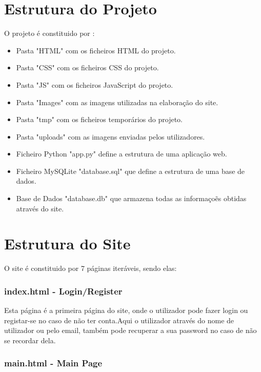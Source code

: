 \documentclass{report}
\begin{document}
\section {Estrutura do Projeto}\label{sec:estrutura-do-projeto}

O projeto é constituido por :

\begin{itemize}
    \item Pasta "HTML" com os ficheiros HTML do projeto.
    \item Pasta "CSS" com os ficheiros CSS do projeto.
    \item Pasta "JS" com os ficheiros JavaScript do projeto.
    \item Pasta "Images" com as imagens utilizadas na elaboração do site.
    \item Pasta "tmp" com os ficheiros temporários do projeto.
    \item Pasta "uploads" com as imagens enviadas pelos utilizadores.
    \item Ficheiro Python "app.py" define a estrutura de uma aplicação web.
    \item Ficheiro MySQLite "database.sql" que define a estrutura de uma base de dados.
    \item Base de Dados "database.db" que armazena todas as informaçoẽs obtidas através do site.
\end{itemize}

\section {Estrutura do Site}\label{sec:estrutura-do-site}

\indent O site é constituido por 7 páginas iteráveis, sendo elas:

\subsubsection{index.html - Login/Register}

\indent Esta página é a primeira página do site, onde o utilizador pode fazer login ou registar-se no caso de não ter conta.Aqui o utilizador através do nome de utilizador ou pelo email, também pode recuperar a sua password no caso de não se recordar dela.\\


\subsubsection{main.html - Main Page}
\end{document}
